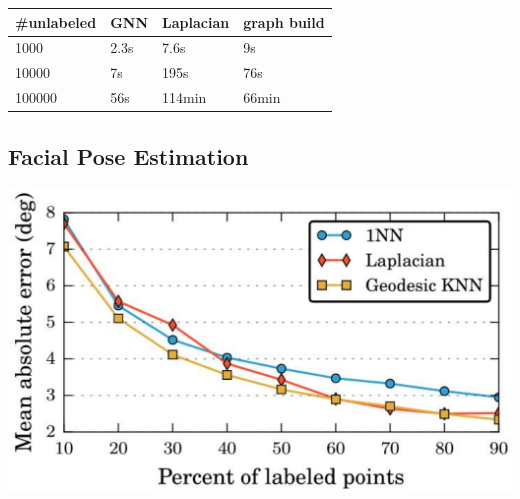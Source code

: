 \documentclass[a0,landscape]{a0poster}
\begin{document}
\begin{multicols}{4}
    \begin{center}
        \begin{tabular}{l l l l}
        \toprule
        \textbf{\#unlabeled} & \textbf{GNN} & \textbf{Laplacian} & \textbf{graph build}\\
        \midrule
        1000 & 2.3s & 7.6s & 9s \\
        10000 & 7s & 195s & 76s \\
        100000 & 56s & 114min & 66min \\
        \bottomrule
        \end{tabular}
    \end{center}
    
\subsection*{Facial Pose Estimation}
    \normalsize
    \begin{center}
        \includegraphics[width=0.8\linewidth]{case2-converted.pdf}
    \end{center}

\color{DarkSlateGray} %


\nocite{*} %


\end{multicols}
\end{document}
